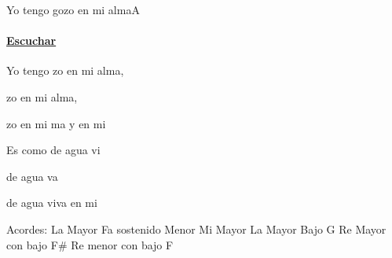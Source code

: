 \documentclass[12pt, spanish]{book}
\begin{document}
    \begin{song}{Yo tengo gozo en mi alma}{A}
        {} %
        {}
        {} %
        {}
        \ifChordBk
        \paragraph{\mbox{}\hfill\protect\href{https://open.spotify.com/intl-es/track/41bcpPTGfQx75KlSYlwCR6}{Escuchar}\mbox{}\hfill}
        \fi

        \begin{SBOpGroup}
            Yo tengo zo en mi alma,

            zo en mi alma,

            zo en mi ma y en mi 

            Es como  de agua vi

             de agua va

             de agua viva en mi 
        \end{SBOpGroup}

        \ifChordBk
        \begin{SBOpGroup}
            Acordes:\break
            \upchord{\A}\qquad La Mayor \hfill
            \upchord{\Fsm}Fa sostenido Menor \hfill\null\break
            \upchord{\E}\qquad Mi Mayor \hfill
            \upchord{\AG}\qquad La Mayor Bajo G \hfill\null\break
            \upchord{\DFs}\qquad Re Mayor con bajo F\# \hfill
            \upchord{\DmF}\qquad Re menor con bajo F \hfill\null\break
        \end{SBOpGroup}
        \fi
    \end{song}
\end{document}
